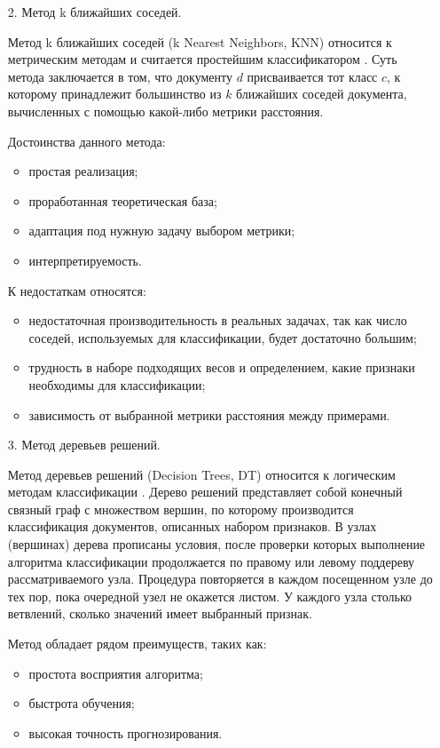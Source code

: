 \begin{enumerate}
\item[2.] Метод k ближайших соседей.

Метод k ближайших соседей (k Nearest Neighbors, KNN) относится к метрическим методам и считается простейшим классификатором \cite{neighbors}. Суть метода заключается в том, что документу $d$ присваивается тот класс $c$, к которому принадлежит большинство из $k$ ближайших соседей документа, вычисленных с помощью какой-либо метрики расстояния.

Достоинства данного метода: 
\begin{itemize}
\item простая реализация;
\item проработанная теоретическая база;
\item адаптация под нужную задачу выбором метрики;
\item интерпретируемость.
\end{itemize}

К недостаткам относятся: 
\begin{itemize}
\item недостаточная производительность в реальных задачах, так как число соседей, используемых для классификации, будет достаточно большим; 
\item трудность в наборе подходящих весов и определением, какие признаки необходимы для классификации; 
\item зависимость от выбранной метрики расстояния между примерами.
\end{itemize}

\item[3.] Метод деревьев решений.

Метод деревьев решений (Decision Trees, DT) относится к логическим методам классификации \cite{tree}. Дерево решений представляет собой конечный связный граф с множеством вершин, по которому производится классификация документов, описанных набором признаков. В узлах (вершинах) дерева прописаны условия, после проверки которых выполнение алгоритма классификации продолжается по правому или левому поддереву рассматриваемого узла. Процедура повторяется в каждом посещенном узле до тех пор, пока очередной узел не окажется листом. У каждого узла столько ветвлений, сколько значений имеет выбранный признак. 

Метод обладает рядом преимуществ, таких как:
\begin{itemize}
\item простота восприятия алгоритма;
\item быстрота обучения;
\item высокая точность прогнозирования. 
\end{itemize}


\end{enumerate}
